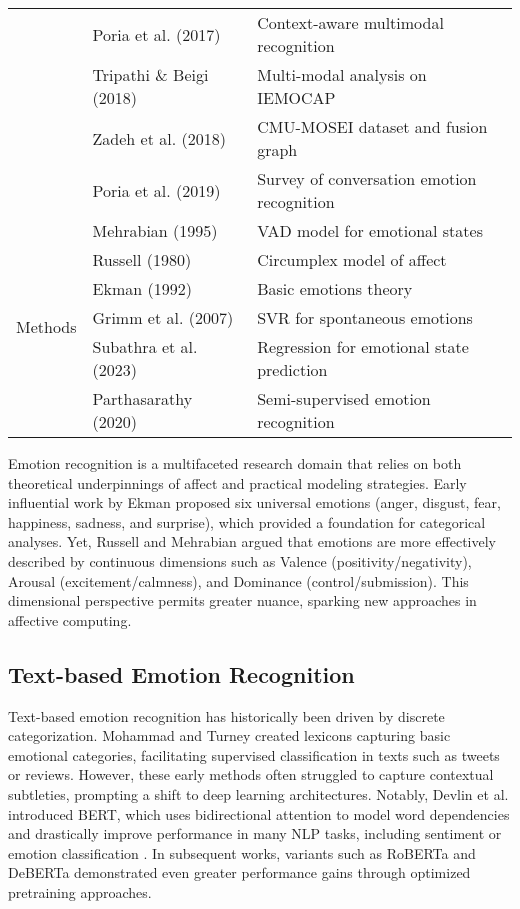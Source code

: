 \documentclass[conference]{IEEEtran}
\begin{document}
\begin{table}[htbp]
\begin{tabular}{|p{1.2cm}|p{1.8cm}|p{4.5cm}|}
\cline{2-3}
& Poria et al. (2017) & Context-aware multimodal recognition \\
\cline{2-3}
& Tripathi \& Beigi (2018) & Multi-modal analysis on IEMOCAP \\
\cline{2-3}
& Zadeh et al. (2018) & CMU-MOSEI dataset and fusion graph \\
\cline{2-3}
& Poria et al. (2019) & Survey of conversation emotion recognition \\
\hline
\multirow{6}{*}{Methods} & 
Mehrabian (1995) & VAD model for emotional states \\
\cline{2-3}
& Russell (1980) & Circumplex model of affect \\
\cline{2-3}
& Ekman (1992) & Basic emotions theory \\
\cline{2-3}
& Grimm et al. (2007) & SVR for spontaneous emotions \\
\cline{2-3}
& Subathra et al. (2023) & Regression for emotional state prediction \\
\cline{2-3}
& Parthasarathy (2020) & Semi-supervised emotion recognition \\
\hline
\end{tabular}
\end{table}
Emotion recognition is a multifaceted research domain that relies on both theoretical underpinnings of affect and practical modeling strategies. Early influential work by Ekman \cite{ekman1992anargument} proposed six universal emotions (anger, disgust, fear, happiness, sadness, and surprise), which provided a foundation for categorical analyses. Yet, Russell \cite{russell1980circumplex} and Mehrabian \cite{mehrabian1995framework} argued that emotions are more effectively described by continuous dimensions such as Valence (positivity/negativity), Arousal (excitement/calmness), and Dominance (control/submission). This dimensional perspective permits greater nuance, sparking new approaches in affective computing.

\subsection{Text-based Emotion Recognition}
Text-based emotion recognition has historically been driven by discrete categorization. Mohammad and Turney \cite{mohammad2015emotion} created lexicons capturing basic emotional categories, facilitating supervised classification in texts such as tweets or reviews. However, these early methods often struggled to capture contextual subtleties, prompting a shift to deep learning architectures. Notably, Devlin et al. \cite{devlin2018bert} introduced BERT, which uses bidirectional attention to model word dependencies and drastically improve performance in many NLP tasks, including sentiment or emotion classification \cite{yadav2020sentiment}. In subsequent works, variants such as RoBERTa \cite{liu2019roberta} and DeBERTa \cite{he2020deberta} demonstrated even greater performance gains through optimized pretraining approaches.
\end{document}
